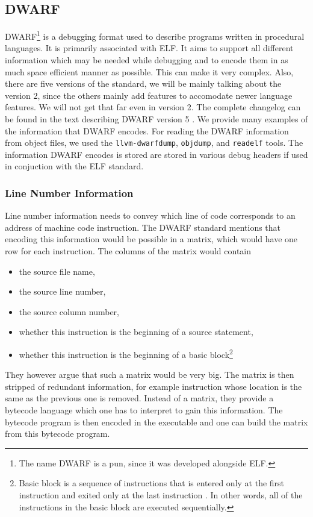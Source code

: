 \subsection{DWARF}
DWARF\footnote{The name DWARF is a pun, since it was developed alongside ELF.}
is a debugging format used to describe programs written in procedural
languages. It is primarily associated with ELF. It aims to support all
different information which may be needed while debugging and to encode them in
as much space efficient manner as possible. This can make it very complex.
Also, there are five versions of the standard, we will be mainly talking about
the version 2, since the others mainly add features to accomodate newer
language features. We will not get that far even in version 2. The complete
changelog can be found in the text describing DWARF version 5 \cite{dwarf-5}.
We provide many examples of the information that DWARF encodes. For reading
the DWARF information from object files, we used the \texttt{llvm-dwarfdump},
\texttt{objdump}, and \texttt{readelf} tools. The information DWARF encodes
is stored are stored in various debug headers if used in conjuction
with the ELF standard.

\subsubsection{Line Number Information}
Line number information needs to convey which line of code corresponds to an
address of machine code instruction. The DWARF standard \cite{dwarf} mentions
that encoding this information would be possible in a matrix, which would have
one row for each instruction. The columns of the matrix would contain
\begin{itemize}
    \item the source file name,
    \item the source line number,
    \item the source column number,
    \item whether this instruction is the beginning of a source statement,
    \item whether this instruction is the beginning of a basic
        block\footnote{Basic block is a sequence of instructions that is
        entered only at the first instruction and exited only at the last
        instruction \cite{dwarf}. In other words, all of the instructions in
        the basic block are executed sequentially.}
\end{itemize}
They however argue that such a matrix would be very big. The matrix is then
stripped of redundant information, for example instruction whose location is
the same as the previous one is removed. Instead of a matrix, they provide a
bytecode language which one has to interpret to gain this information. The
bytecode program is then encoded in the executable and one can build the 
matrix from this bytecode program.


